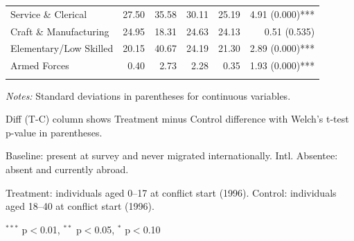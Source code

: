 \begin{table}[htbp]
\begin{tabular}{lrrrrr}
\quad Service \& Clerical & 27.50 & 35.58 & 30.11 & 25.19 & 4.91 (0.000)*** \\
\quad Craft \& Manufacturing & 24.95 & 18.31 & 24.63 & 24.13 & 0.51 (0.535) \\
\quad Elementary/Low Skilled & 20.15 & 40.67 & 24.19 & 21.30 & 2.89 (0.000)*** \\
\quad Armed Forces & 0.40 & 2.73 & 2.28 & 0.35 & 1.93 (0.000)*** \\
\addlinespace
\bottomrule
\end{tabular}
\begin{tablenotes}
\small
\item \textit{Notes:} Standard deviations in parentheses for continuous variables.
\item Diff (T-C) column shows Treatment minus Control difference with Welch's t-test p-value in parentheses.
\item Baseline: present at survey and never migrated internationally. Intl. Absentee: absent and currently abroad.
\item Treatment: individuals aged 0--17 at conflict start (1996). Control: individuals aged 18--40 at conflict start (1996).
\item $^{***}$ p$<$0.01, $^{**}$ p$<$0.05, $^{*}$ p$<$0.10
\end{tablenotes}
\end{table}